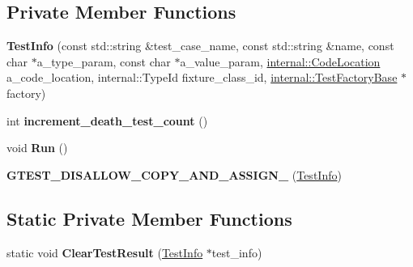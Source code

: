 \subsection*{Private Member Functions}
\begin{DoxyCompactItemize}
\item 
\mbox{\label{classtesting_1_1_test_info_afc4a66e2d2491f09e8549c71514c3d78}} 
{\bfseries Test\+Info} (const std\+::string \&test\+\_\+case\+\_\+name, const std\+::string \&name, const char $\ast$a\+\_\+type\+\_\+param, const char $\ast$a\+\_\+value\+\_\+param, \hyperlink{structtesting_1_1internal_1_1_code_location}{internal\+::\+Code\+Location} a\+\_\+code\+\_\+location, internal\+::\+Type\+Id fixture\+\_\+class\+\_\+id, \hyperlink{classtesting_1_1internal_1_1_test_factory_base}{internal\+::\+Test\+Factory\+Base} $\ast$factory)
\item 
\mbox{\label{classtesting_1_1_test_info_a70c9509202a6f95fbc26704ce13efb63}} 
int {\bfseries increment\+\_\+death\+\_\+test\+\_\+count} ()
\item 
\mbox{\label{classtesting_1_1_test_info_ade784915e9be3a01e3a6ef509b77d6c9}} 
void {\bfseries Run} ()
\item 
\mbox{\label{classtesting_1_1_test_info_a49607d4547e374b5248e4200d9192817}} 
{\bfseries G\+T\+E\+S\+T\+\_\+\+D\+I\+S\+A\+L\+L\+O\+W\+\_\+\+C\+O\+P\+Y\+\_\+\+A\+N\+D\+\_\+\+A\+S\+S\+I\+G\+N\+\_\+} (\hyperlink{classtesting_1_1_test_info}{Test\+Info})
\end{DoxyCompactItemize}
\subsection*{Static Private Member Functions}
\begin{DoxyCompactItemize}
\item 
\mbox{\label{classtesting_1_1_test_info_ac6d80865a3e68478aaf167058e6ca5c2}} 
static void {\bfseries Clear\+Test\+Result} (\hyperlink{classtesting_1_1_test_info}{Test\+Info} $\ast$test\+\_\+info)
\end{DoxyCompactItemize}
